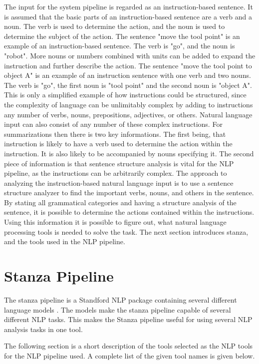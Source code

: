 The input for the system pipeline is regarded as an instruction-based sentence. It is assumed that the basic parts of an instruction-based sentence are a verb and a noun. The verb is used to determine the action, and the noun is used to determine the subject of the action. The sentence "move the tool point" is an example of an instruction-based sentence. The verb is "go", and the noun is "robot". More nouns or numbers combined with units can be added to expand the instruction and further describe the action. The sentence "move the tool point to object A" is an example of an instruction sentence with one verb and two nouns. The verb is "go", the first noun is "tool point" and the second noun is "object A". This is only a simplified example of how instructions could be structured, since the complexity of language can be unlimitably complex by adding to instructions any number of verbs, nouns, prepositions, adjectives, or others. Natural language input can also consist of any number of these complex instructions.
For summarizations then there is two key informations. The first being, that instruction is likely to have a verb used to determine the action within the instruction. It is also likely to be accompanied by nouns specifying it.
The second piece of information is that sentence structure analysis is vital for the NLP pipeline, as the instructions can be arbitrarily complex.
The approach to analyzing the instruction-based natural language input is to use a sentence structure analyzer to find the important verbs, nouns, and others in the sentence. By stating all grammatical categories and having a structure analysis of the sentence, it is possible to determine the actions contained within the instructions. Using this information it is possible to figure out, what natural language processing tools is needed to solve the task. The next section introduces stanza, and the tools used in the NLP pipeline.

\section{Stanza Pipeline} \label{sec:Stanza}
The stanza pipeline is a Standford NLP package containing several different language models \cite{qi2020stanza}. The models make the stanza pipeline capable of several different NLP tasks. This makes the Stanza pipeline useful for using several NLP analysis tasks in one tool.

The following section is a short description of the tools selected as the NLP tools for the NLP pipeline used. A complete list of the given tool names is given below.

